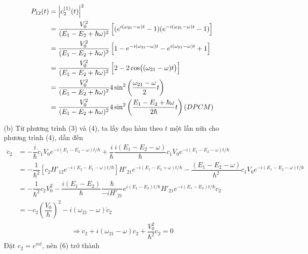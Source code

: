 \documentclass{article}
\newcommand{\f}[2]{\dfrac{#1}{#2}}
\begin{document}
\begin{enumerate}
\begin{align*}
		      P_{12}(t)
		       & = \abs{c_{2}^{(1)}(t)}^2                                                                                                             \\
		       & = \f{V_{0}^2}{(E_{1} - E_{2} + \hbar \omega)^2} \left[(e^{i(\omega_{21} - \omega) t} - 1)(e^{-i(\omega_{21} - \omega) t} - 1)\right] \\
		       & = \f{V_{0}^2}{(E_{1} - E_{2} + \hbar \omega)^2} \left[1 - e^{-i(\omega_{21} - \omega) t} -e^{i(\omega_{21} - \omega) t} + 1 \right]  \\
		       & = \f{V_{0}^2}{(E_{1} - E_{2} + \hbar \omega)^2} \left[2 - 2\cos((\omega_{21} - \omega)t)\right]                                      \\
		       & = \f{V_{0}^2}{(E_{1} - E_{2} + \hbar \omega)^2} 4 \sin^2\left( \f{\omega_{21} - \omega}{2}t \right)                                  \\
		       & = \f{V_{0}^2}{(E_{1} - E_{2} + \hbar \omega)^2} 4 \sin^2\left( \f{E_{1} - E_{2} + \hbar\omega}{2\hbar}t \right) (DPCM)
	      \end{align*}
	\item [(b)] Từ phương trình (3) và (4), ta lấy đạo hàm theo $t$ một lần nữa cho phương trình (4), dẫn đến
	      \begin{align*}
		      \ddot{c}_{2}
		       & = - \f{i}{\hbar} \dot{c}_{1}V_{0} e^{-i(E_1 - E_2 - \omega) t / \hbar} + \f{i}{\hbar}\f{i(E_{1} - E_{2} - \omega)}{\hbar} c_{1} V_{0} e^{-i(E_1 - E_2 - \omega) t / \hbar}                                                \\
		       & = - \f{1}{\hbar^2} \left[ c_{2} H'_{12} e^{-i(E_2 - E_1 - \omega) t / \hbar} \right]H'_{21} e^{-i(E_1 - E_2 + \omega) t / \hbar} - \f{(E_{1} - E_{2} - \omega)}{\hbar^2} c_{1} V_{0} e^{-i(E_1 - E_2 - \omega) t / \hbar} \\
		       & = - \f{1}{\hbar^2} c_{2} V_{0}^2  - \f{i(E_{1} - E_{2})}{\hbar}\f{\hbar}{-i H'_{21}}e^{i(E_1 - E_2) t / \hbar} H'_{21} e^{-i(E_1 - E_2) t / \hbar} \dot{c}_{2}                                                            \\
		       & = -c_{2} \left(\f{V_{0}}{\hbar}\right)^2 - i (\omega_{21} - \omega)\dot{c}_{2}
	      \end{align*}
	      \begin{align*}
		      \Rightarrow \ddot{c}_{2} + i(\omega_{21} - \omega)\dot{c}_{2} + \f{V_{0}^2}{\hbar^2}c_{2} = 0 \tag{6}
	      \end{align*}
	      Đặt $c_{2} = e^{mt}$, nên (6) trở thành

\end{enumerate}
\end{document}
